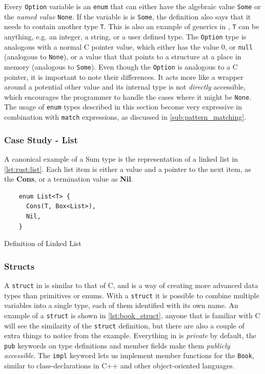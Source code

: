 Every \texttt{Option} variable is an \texttt{enum} that can either have the algebraic value \texttt{Some} or the \emph{named value} \texttt{None}.
If the variable is is \texttt{Some}, the definition also says that it needs to contain another type \texttt{T}.
This is also an example of generics in \rust, \texttt{T} can be anything, e.g. an integer, a string, or a user defined type.
The \texttt{Option} type is analogous with a normal C pointer value, which either has the value 0, or \texttt{null} (analogous to \texttt{None}), or a value that that points to a structure at a place in memory (analogous to \texttt{Some}).
Even though the \texttt{Option} is analogous to a C pointer, it is important to note their differences.
It acts more like a wrapper around a potential other value and its internal type is not \emph{directly} accessible, which encourages the programmer to handle the cases where it might be \texttt{None}.
The usage of \texttt{enum} types described in this section become very expressive in combination with \texttt{match} expressions, as discussed in \autoref{sub:pattern_matching}.

\subsubsection{Case Study - List}

A canonical example of a Sum type is the representation of a linked list in \autoref{lst:rust:list}.
Each list item is either a value and a pointer to the next item, as the \textbf{Cons}, or a termination value as \textbf{Nil}.

\begin{listing}[H]
  \begin{verbatim}
    enum List<T> {
      Cons(T, Box<List>),
      Nil,
    }
  \end{verbatim}
  \caption{Definition of Linked List}
  \label{lst:rust:list}
\end{listing}

\subsubsection{Structs}
\label{ssub:structs}

A \texttt{struct} in \rust is similar to that of C, and is a way of creating more advanced data types than primitives or enums.
With a \texttt{struct} it is possible to combine multiple variables into a single type, each of them identified with its own name.
An example of a \texttt{struct} is shown in \autoref{lst:book_struct}, anyone that is familiar with C will see the similarity of the \texttt{struct} definition, but there are also a couple of extra things to notice from the example.
Everything in \rust is \emph{private} by default, the \texttt{pub} keywords on type definitions and member fields make them \emph{publicly accessible}.
The \texttt{impl} keyword lets us implement member functions for the \texttt{Book}, similar to class-declarations in C++ and other object-oriented languages.

